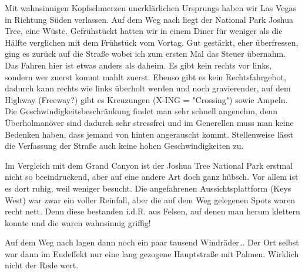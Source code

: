 Mit wahnsinnigen Kopfschmerzen unerklärlichen Ursprungs haben wir Las Vegas in Richtung Süden verlassen.
Auf dem Weg nach  liegt der National Park Joshua Tree, eine Wüste.
Gefrühstückt hatten wir in einem Diner für weniger als die Hälfte verglichen mit dem Frühstück vom Vortag.
Gut gestärkt, eher überfressen, ging es zurück auf die Straße wobei ich zum ersten Mal das Steuer übernahm.
Das Fahren hier ist etwas anders als daheim. Es gibt kein rechts vor links, sondern wer zuerst kommt mahlt zuerst.
Ebenso gibt es kein Rechtsfahrgebot, dadurch kann rechts wie links überholt werden und noch gravierender, auf dem Highway (Freeway?) gibt es Kreuzungen (X-ING = "Crossing") sowie Ampeln.
Die Geschwindigkeitsbeschränkung findet man sehr schnell angenehm, denn Überholmanöver sind dadurch sehr stressfrei und im Generellen muss man keine Bedenken haben, dass jemand von hinten angerauscht kommt.
Stellenweise lässt die Verfassung der Straße auch keine hohen Geschwindigkeiten zu.

Im Vergleich mit dem Grand Canyon ist der Joshua Tree National Park erstmal nicht so beeindruckend, aber auf eine andere Art doch ganz hübsch.
Vor allem ist es dort ruhig, weil weniger besucht.
Die angefahrenen Aussichtsplattform (Keys West) war zwar ein voller Reinfall, aber die auf dem Weg gelegenen Spots waren recht nett.
Denn diese bestanden i.d.R. aus Felsen, auf denen man herum klettern konnte und die waren wahnsinnig griffig!

\newpage
\thispagestyle{empty}
\newpage

Auf dem Weg nach  lagen dann noch ein paar tausend Windräder\dots
Der Ort selbst war dann im Endeffekt nur eine lang gezogene Hauptstraße mit Palmen.
Wirklich nicht der Rede wert.

